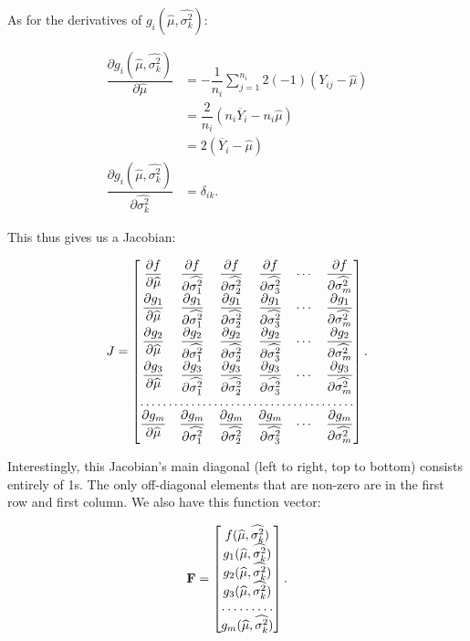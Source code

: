 \documentclass[12pt,a4paper]{article}
\newcommand{\ovY}{\overline{Y}}
\newcommand{\wmu}{\widehat{\mu}}
\newcommand{\wst}[1]{\widehat{\sigma^2_{#1}}}
\begin{document}
	As for the derivatives of $g_i(\wmu, \wst{k})$:
	
	\begin{align*}
		\dfrac{\partial g_i(\wmu, \wst{k})}{\partial \wmu} &= -\dfrac{1}{n_i} \sum_{j=1}^{n_i} 2(-1)(Y_{ij}-\wmu) \\
		&= \dfrac{2}{n_i} (n_i\ovY_i - n_i\wmu) \\
		&= 2(\ovY_i-\wmu) \\
		\dfrac{\partial g_i(\wmu, \wst{k})}{\partial \wst{k}} &= \delta_{ik}.
	\end{align*}

	This thus gives us a Jacobian:
	
	\begin{align*}
		J = \left[\begin{matrix}
			\dfrac{\partial f}{\partial \wmu} & \dfrac{\partial f}{\partial \wst{1}} & \dfrac{\partial f}{\partial \wst{2}} & \dfrac{\partial f}{\partial \wst{3}} & \cdots & \dfrac{\partial f}{\partial \wst{m}} \\
			\dfrac{\partial g_1}{\partial \wmu} & \dfrac{\partial g_1}{\partial \wst{1}} & \dfrac{\partial g_1}{\partial \wst{2}} & \dfrac{\partial g_1}{\partial \wst{3}} & \cdots & \dfrac{\partial g_1}{\partial \wst{m}} \\
			\dfrac{\partial g_2}{\partial \wmu} & \dfrac{\partial g_2}{\partial \wst{1}} & \dfrac{\partial g_2}{\partial \wst{2}} & \dfrac{\partial g_2}{\partial \wst{3}} & \cdots & \dfrac{\partial g_2}{\partial \wst{m}} \\
			\dfrac{\partial g_3}{\partial \wmu} & \dfrac{\partial g_3}{\partial \wst{1}} & \dfrac{\partial g_3}{\partial \wst{2}} & \dfrac{\partial g_3}{\partial \wst{3}} & \cdots & \dfrac{\partial g_3}{\partial \wst{m}} \\
			\hdotsfor{6} \\
			\dfrac{\partial g_m}{\partial \wmu} & \dfrac{\partial g_m}{\partial \wst{1}} & \dfrac{\partial g_m}{\partial \wst{2}} & \dfrac{\partial g_m}{\partial \wst{3}} & \cdots & \dfrac{\partial g_m}{\partial \wst{m}}
		\end{matrix}\right].
	\end{align*}

	Interestingly, this Jacobian's main diagonal (left to right, top to bottom) consists entirely of 1s. The only off-diagonal elements that are non-zero are in the first row and first column. We also have this function vector:
	
	\begin{align*}
		\mathbf{F} = \left[
		\begin{matrix}
			f(\wmu, \wst{k}) \\
			g_1(\wmu, \wst{k}) \\
			g_2(\wmu, \wst{k}) \\
			g_3(\wmu, \wst{k}) \\
			\hdotsfor{1} \\
			g_m(\wmu, \wst{k})
		\end{matrix}
	\right].
	\end{align*}
\end{document}
